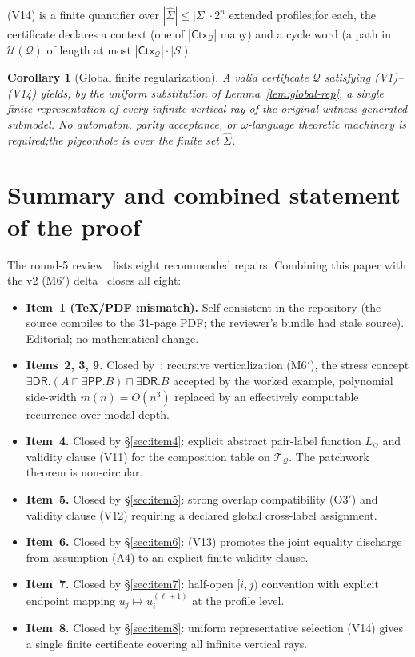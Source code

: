 \documentclass[11pt]{article}
\newtheorem{corollary}[theorem]{Corollary}
\theoremstyle{definition}
\theoremstyle{remark}
\newcommand{\DR}{\mathsf{DR}}
\newcommand{\PP}{\mathsf{PP}}
\newcommand{\Ctx}{\mathsf{Ctx}}
\newcommand{\Q}{\mathcal{Q}}
\newcommand{\U}{\mathcal{U}}
\newcommand{\T}{\mathcal{T}}
\newcommand{\extSigma}{\widehat\Sigma}
\begin{document}
(V14) is a finite quantifier over $|\extSigma|\leq|\Sigma|\cdot
2^n$ extended profiles;\@ for each, the certificate declares a
context (one of $|\Ctx_\Q|$ many) and a cycle word (a path in
$\U(\Q)$ of length at most $|\Ctx_\Q|\cdot|S|$).

\begin{corollary}[Global finite regularization]\label{cor:global-reg}
A valid certificate $\Q$ satisfying (V1)--(V14) yields, by the
uniform substitution of Lemma~\ref{lem:global-rep}, a single finite
representation of every infinite vertical ray of the original
witness-generated submodel.  No automaton, parity acceptance, or
$\omega$-language theoretic machinery is required;\@ the
pigeonhole is over the finite set $\extSigma$.
\end{corollary}

\section{Summary and combined statement of the proof}
\label{sec:summary}

The round-5 review~\cite{GPT55Round5Review} lists eight
recommended repairs.  Combining this paper with the v2 (M6$'$)
delta~\cite{V2Delta} closes all eight:

\begin{itemize}
\item \textbf{Item~1 (TeX/PDF mismatch).}  Self-consistent in the
repository (the source compiles to the 31-page PDF; the reviewer's
bundle had stale source).  Editorial; no mathematical change.
\item \textbf{Items~2, 3, 9.}  Closed by~\cite{V2Delta}: recursive
verticalization (M6$'$), the stress concept
$\exists\DR.(A\sqcap\exists\PP.B)\sqcap\exists\DR.B$ accepted by
the worked example, polynomial side-width $m(n)=O(n^3)$ replaced
by an effectively computable recurrence over modal depth.
\item \textbf{Item~4.}  Closed by \S\ref{sec:item4}: explicit
abstract pair-label function $L_\Q$ and validity clause (V11) for
the composition table on $\T_\Q$.  The patchwork theorem is
non-circular.
\item \textbf{Item~5.}  Closed by \S\ref{sec:item5}: strong overlap
compatibility (O3$'$) and validity clause (V12) requiring a
declared global cross-label assignment.
\item \textbf{Item~6.}  Closed by \S\ref{sec:item6}: (V13) promotes
the joint equality discharge from assumption (A4) to an explicit
finite validity clause.
\item \textbf{Item~7.}  Closed by \S\ref{sec:item7}: half-open
$[i,j)$ convention with explicit endpoint mapping
$u_j\mapsto u_i^{(\ell+1)}$ at the profile level.
\item \textbf{Item~8.}  Closed by \S\ref{sec:item8}: uniform
representative selection (V14) gives a single finite certificate
covering all infinite vertical rays.
\end{itemize}
\end{document}
